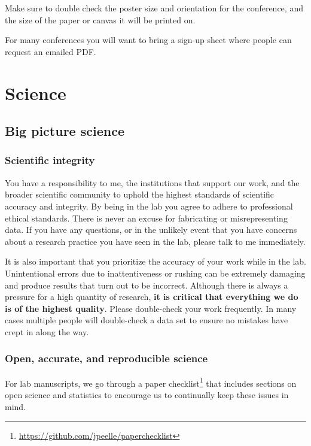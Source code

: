 \documentclass[letterpaper,12pt,oneside]{memoir}
\begin{document}
Make sure to double check the poster size and orientation for the conference, and the size of the paper or canvas it will be printed on.

For many conferences you will want to bring a sign-up sheet where people can request an emailed PDF.



\chapter{Science}
\label{ch:Science}

\section{Big picture science}

\subsection{Scientific integrity}

You have a responsibility to me, the institutions that support our work, and the broader scientific community to uphold the highest standards of scientific accuracy and integrity. By being in the lab you agree to adhere to professional ethical standards. There is never an excuse for fabricating or misrepresenting data. If you have any questions, or in the unlikely event that you have concerns about a research practice you have seen in the lab, please talk to me immediately.

It is also important that you prioritize the accuracy of your work while in the lab. Unintentional errors due to inattentiveness or rushing can be extremely damaging and produce results that turn out to be incorrect. Although there is always a pressure for a high quantity of research, \textbf{it is critical that everything we do is of the highest quality}. Please double-check your work frequently. In many cases multiple people will double-check a data set to ensure no mistakes have crept in along the way.


\subsection{Open, accurate, and reproducible science}
\label{sec:openscience}

For lab manuscripts, we go through a paper checklist\footnote{\url{https://github.com/jpeelle/paperchecklist}} that includes sections on open science and statistics to encourage us to continually keep these issues in mind.
\end{document}
